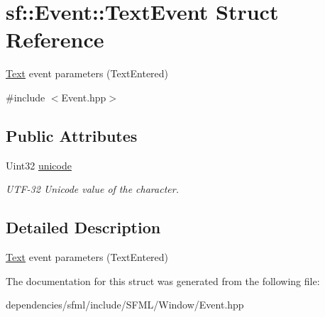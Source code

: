 \hypertarget{structsf_1_1_event_1_1_text_event}{}\section{sf\+:\+:Event\+:\+:Text\+Event Struct Reference}
\label{structsf_1_1_event_1_1_text_event}


\hyperlink{classsf_1_1_text}{Text} event parameters (Text\+Entered)  




{\ttfamily \#include $<$Event.\+hpp$>$}

\subsection*{Public Attributes}
\begin{DoxyCompactItemize}
\item 
\mbox{\label{structsf_1_1_event_1_1_text_event_a00d96b1a5328a1d7cbc276e161befcb0}} 
Uint32 \hyperlink{structsf_1_1_event_1_1_text_event_a00d96b1a5328a1d7cbc276e161befcb0}{unicode}
\begin{DoxyCompactList}\small\item\em U\+T\+F-\/32 Unicode value of the character. \end{DoxyCompactList}\end{DoxyCompactItemize}


\subsection{Detailed Description}
\hyperlink{classsf_1_1_text}{Text} event parameters (Text\+Entered) 

The documentation for this struct was generated from the following file\+:\begin{DoxyCompactItemize}
\item 
dependencies/sfml/include/\+S\+F\+M\+L/\+Window/Event.\+hpp\end{DoxyCompactItemize}

